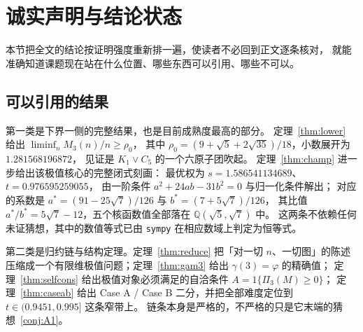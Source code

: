 \documentclass[UTF8,11pt]{ctexart}
\theoremstyle{definition}
\newcommand{\Q}{\mathbb{Q}}
\begin{document}
\section{诚实声明与结论状态}\label{sec:honest}

本节把全文的结论按证明强度重新排一遍，使读者不必回到正文逐条核对，
就能准确知道课题现在站在什么位置、哪些东西可以引用、哪些不可以。

\subsection{可以引用的结果}

第一类是下界一侧的完整结果，也是目前成熟度最高的部分。
定理~\ref{thm:lower} 给出 $\liminf_{n}M_3(n)/n\ge\rho_0$，
其中 $\rho_0=(9+\sqrt5+2\sqrt{35})/18$，小数展开为 $1.281568196872$，
见证是 $K_1\vee C_5$ 的一个六原子团吹起。
定理~\ref{thm:champ} 进一步给出该极值核心的完整闭式刻画：
最优权为 $s=1.586541134689$、$t=0.976595259055$，
由一阶条件 $a^2+24ab-31b^2=0$ 与归一化条件解出；
对应的系数是 $a^*=(91-25\sqrt7)/126$ 与 $b^*=(7+5\sqrt7)/126$，
其比值 $a^*/b^*=5\sqrt7-12$，五个核函数值全部落在 $\Q(\sqrt5,\sqrt7)$ 中。
这两条不依赖任何未证猜想，其中的数值等式已由 \texttt{sympy} 在相应数域上判定为恒等式。

第二类是归约链与结构定理。定理~\ref{thm:reduce} 把「对一切 $n$、一切图」的陈述
压缩成一个有限维极值问题；定理~\ref{thm:gam3} 给出 $\gamma(3)=\varphi$ 的精确值；
定理~\ref{thm:selfcons} 给出极值对象必须满足的自洽条件 $A=1\{\Pi_3(M)\ge0\}$；
定理~\ref{thm:caseab} 给出 Case A / Case B 二分，并把全部难度定位到 $t\in(0.9451,0.995]$ 这条窄带上。
链条本身是严格的，不严格的只是它末端的猜想~\ref{conj:A1}。
\end{document}
